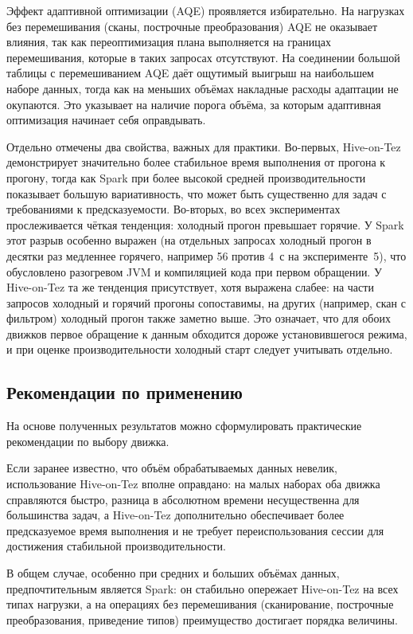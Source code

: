 \documentclass[12pt,letterpaper, onecolumn]{exam}
\begin{document}
Эффект адаптивной оптимизации (AQE) проявляется избирательно. На нагрузках без
перемешивания (сканы, построчные преобразования) AQE не оказывает влияния, так
как переоптимизация плана выполняется на границах перемешивания, которые в
таких запросах отсутствуют. На соединении большой таблицы с перемешиванием AQE
даёт ощутимый выигрыш на наибольшем наборе данных, тогда как на меньших объёмах
накладные расходы адаптации не окупаются. Это указывает на наличие порога
объёма, за которым адаптивная оптимизация начинает себя оправдывать.

Отдельно отмечены два свойства, важных для практики. Во-первых, Hive-on-Tez
демонстрирует значительно более стабильное время выполнения от прогона к
прогону, тогда как Spark при более высокой средней производительности
показывает большую вариативность, что может быть существенно для задач с
требованиями к предсказуемости. Во-вторых, во всех экспериментах прослеживается
чёткая тенденция: холодный прогон превышает горячие. У Spark этот разрыв
особенно выражен (на отдельных запросах холодный прогон в десятки раз медленнее
горячего, например 56 против 4~с на эксперименте~5), что обусловлено разогревом
JVM и компиляцией кода при первом обращении. У Hive-on-Tez та же тенденция
присутствует, хотя выражена слабее: на части запросов холодный и горячий прогоны
сопоставимы, на других (например, скан с фильтром) холодный прогон также заметно
выше. Это означает, что для обоих движков первое обращение к данным обходится
дороже установившегося режима, и при оценке производительности холодный старт
следует учитывать отдельно.

\subsection{Рекомендации по применению}

На основе полученных результатов можно сформулировать практические рекомендации
по выбору движка.

Если заранее известно, что объём обрабатываемых данных невелик, использование
Hive-on-Tez вполне оправдано: на малых наборах оба движка справляются быстро,
разница в абсолютном времени несущественна для большинства задач, а Hive-on-Tez
дополнительно обеспечивает более предсказуемое время выполнения и не требует
переиспользования сессии для достижения стабильной производительности.

В общем случае, особенно при средних и больших объёмах данных, предпочтительным
является Spark: он стабильно опережает Hive-on-Tez на всех типах нагрузки, а на
операциях без перемешивания (сканирование, построчные преобразования,
приведение типов) преимущество достигает порядка величины.
\end{document}
